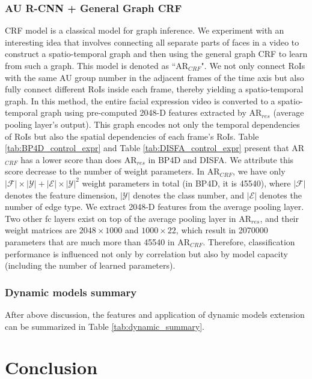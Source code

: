 \documentclass[5p,twocolumn]{elsarticle}
\begin{document}
\subsubsection{AU R-CNN + General Graph CRF}
CRF model is a classical model for graph inference. We experiment with an interesting idea that involves connecting all separate parts of faces in a video to construct a spatio-temporal graph and then using the general graph CRF to learn from such a graph. This model is denoted as ``AR$_{CRF}$". We not only connect RoIs with the same AU group number in the adjacent frames of the time axis but also fully connect different RoIs inside each frame, thereby yielding a spatio-temporal graph. In this method, the entire facial expression video is converted to a spatio-temporal graph using pre-computed 2048-D features extracted by AR$_{res}$ (average pooling layer's output). This graph encodes not only the temporal dependencies of RoIs but also the spatial dependencies of each frame's RoIs. Table \ref{tab:BP4D_control_expr} and Table \ref{tab:DISFA_control_expr} present that AR$_{CRF}$ has a lower score than does AR$_{res}$ in BP4D and DISFA. We attribute this score decrease to the number of weight parameters. In AR$_{CRF}$, we have only $|\mathcal{F}| \times |\mathcal{Y}| + |\mathcal{E}| \times |\mathcal{Y}|^ 2$ weight parameters in total (in BP4D, it is \num{45540}), where $|\mathcal{F}|$ denotes the feature dimension, $|\mathcal{Y}|$ denotes the class number, and $|\mathcal{E}|$ denotes the number of edge type. We extract 2048-D features from the average pooling layer. Two other fc layers exist on top of the average pooling layer in AR$_{res}$, and their weight matrices are $2048 \times 1000$ and $1000 \times 22$, which result in \num{2070000} parameters that are much more than \num{45540} in AR$_{CRF}$. Therefore, classification performance is influenced not only by correlation but also by model capacity (including the number of learned parameters).

\subsubsection{Dynamic models summary}
After above discussion, the features and application of dynamic models extension can be summarized in Table \ref{tab:dynamic_summary}.



\section{Conclusion}
\end{document}
